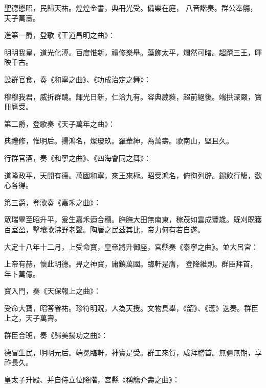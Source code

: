 \begin{pinyinscope}
 聖德懋昭，民歸天祐。煌煌金書，典冊光受。備樂在庭，
 八音諧奏。群公奉觴，天子萬壽。



 進第一爵，登歌《王道昌明之曲》：



 明明我皇，道光化溥。百度惟新，禮修樂舉。藻飾太平，爛然可睹。超躋三王，暉映千古。



 設群官食，奏《和寧之曲》、《功成治定之舞》：



 穆穆我君，威折群醜。輝光日新，仁洽九有。容典葳蕤，超前絕後。端拱深嚴，寶冊膺受。



 第二爵，登歌奏《天子萬年之曲》：



 典禮修，惟明后。揚鴻名，燦瓊玖。羅華紳，為萬壽。歌南山，堅且久。



 行群官酒，奏《和寧之曲》、《四海會同之舞》：



 道隆政平，天開有德。萬國和寧，來王來極。昭受鴻名，俯徇列辟。錫飲行觴，歡心各得。



 第三爵，登歌奏《嘉禾之曲》：



 眾瑞畢至昭升平，爰生嘉禾迺合穗。膴膴大田無南東，稼茂如雲成豐歲。既刈既獲百室盈，擊壤歌沸野老聲。陶唐之民茲其比，帝力何有若自遂。



 大定十八年十二月，上受命寶，皇帝將升御座，宮縣奏《泰寧之曲》。並大呂宮：



 上帝有赫，懷此明德。畀之神寶，庸鎮萬國。臨軒是膺，
 登降維則。群臣拜首，年卜萬億。



 寶入門，奏《天保報上之曲》：



 受命大寶，昭答眷祐。珍符明貺，人為天授。文物具舉，《韶》、《濩》迭奏。群臣上之，天子萬壽。



 群臣合班，奏《歸美揚功之曲》：



 德冒生民，明明元后。端冕臨軒，神寶是受。群工來賀，咸拜稽首。無疆無期，享祚長久。



 皇太子升殿、并自侍立位降階，宮縣《稱觴介壽之曲》：




\end{pinyinscope}
